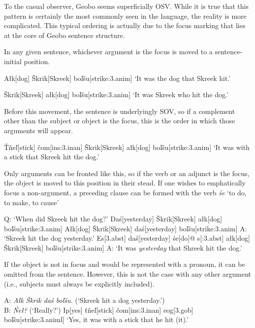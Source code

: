 \documentclass[a4paper,11pt,oneside,openany]{memoir}
\newcommand{\vt}{ť}
\newcommand{\vc}{č}
\newcommand{\vs}{š}
\newcommand{\vl}{ľ}
\newcommand{\vn}{ň}
\newcommand{\vT}{Ť}
\newcommand{\vS}{Š}
\begin{document}
To the casual observer, Geobo{\engma} seems superficially OSV. While it is true that this pattern is certainly the most commonly seen in the language, the reality is more complicated. This typical ordering is actually due to the focus marking that lies at the core of Geobo{\engma} sentence structure.

In any given sentence, whichever argument is the focus is moved to a sentence-initial position. 

\ex
\begingl
A\l k[dog]
\vS krik[Skreek]
bo\vl\vs u[strike:{\sc 3.anim}]
\glft `It was the dog that Skreek hit.'
\endgl
\xe

\ex
\begingl
\vS krik[Skreek]
a\l k[dog]
bo\vl\vs u[strike:{\sc 3.anim}]
\glft `It was Skreek who hit the dog.'
\endgl
\xe

Before this movement, the sentence is underlyingly SOV, so if a complement other than the subject or object is the focus, this is the order in which those arguments will appear.

\ex
\begingl
\vT\vn e{\vl}[stick]
\vc om[\sc ins:3.inan]
\vS krik[Skreek]
a\l k[dog]
bo\vl\vs u[strike:{\sc 3.anim}]
\glft `It was with a stick that Skreek hit the dog.'
\endgl
\xe

Only arguments can be fronted like this, so if the verb or an adjunct is the focus, the object is moved to this position in their stead. If one wishes to emphatically focus a non-argument, a preceding clause can be formed with the verb \textit{\'se} `to do, to make, to cause'

\pex Q: `When did Skreek hit the dog?'
\a \ljudge*
\begingl
Da\'s[yesterday]
\vS krik[Skreek]
a\l k[dog]
bo\vl\vs u[strike:{\sc 3.anim}]
\endgl
\a 
\begingl
A\l k[dog]
\vS krik[Skreek] 
da\'s[yesterday]
bo\vl\vs u[strike:{\sc 3.anim}]
\glft A: `Skreek hit the dog yesterday.'
\endgl
\a 
\begingl
Es[\sc 3.abst]
da\'s[yesterday]
\'se[do]@
s[\sc :3.abst]
\nogloss{,}
a\l k[dog]
\vS krik[Skreek]
bo\vl\vs u[strike:{\sc 3.anim}]
\glft A: `It was \emph{yesterday} that Shreek hit the dog.'
\endgl
\xe

If the object is not in focus and would be represented with a pronoun, it can be omitted from the sentence. However, this is not the case with any other argument (i.e., subjects must always be explicitly included).

\ex
\begingl
\glpreamble A: \textit{A\l k \vS krik da\'s bo\vl\vs u.} (`Skreek hit a dog yesterday.')\\B: \textit{\'Ne\l?} (`Really?')\endpreamble
Ip[yes]
\vt\vn e{\vl}[stick]
\vc om[\sc ins:3.inan]
eog[{\sc 3.gob}]
bo\vl\vs u[strike:{\sc 3.animl}]
\glft `Yes, it was with a stick that he hit (it).'
\endgl
\xe
\end{document}

